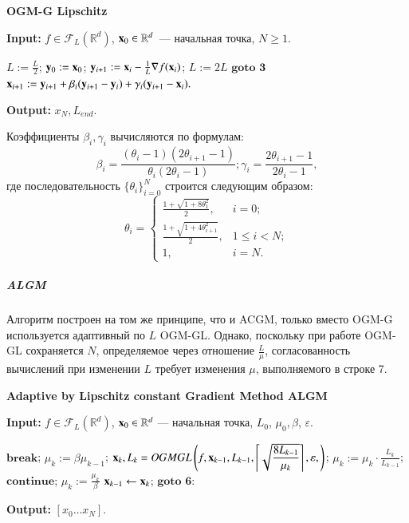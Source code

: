 \documentclass{crm-article}
\begin{document}
\begin{algorithm}
\caption{\bf{OGM-G Lipschitz}}
\label{OGM-GL}
\hspace*{\algorithmicindent} \textbf{Input: }$f\in \mathcal{F}_L(\mathbb{R}^d)$, ${\bf x}_0\in\mathbb{R}^d$~--- начальная точка, $N\geq 1$.
\begin{algorithmic}[1]
\STATE $L := \frac{L}{2}$;
\STATE ${\bf y}_0 := {\bf x}_0$;
\STATE ${\bf y}_{i+1} := {\bf x}_i - \frac{1}{L}\nabla f({\bf x}_i)$;
\STATE $L := 2L$
\STATE $\textbf{goto 3}$
\ENDIF
\STATE ${\bf x}_{i+1} := {\bf y}_{i+1} + \beta_i({\bf y}_{i+1} - {\bf y}_i) + \gamma_i({\bf y}_{i+1} - {\bf x}_i).$
\ENDFOR
\end{algorithmic}
\hspace*{\algorithmicindent} \textbf{Output: } $x_N, L_{end}$.
\end{algorithm}

Коэффициенты $\beta_i, \gamma_i$ вычисляются по формулам:
$$\beta_i = \dfrac{(\theta_i-1)(2\theta_{i+1}-1)}{\theta_i(2\theta_i-1)}; \gamma_i = \dfrac{2\theta_{i+1}-1}{2\theta_i-1},$$
где последовательность $\{\theta_i\}_{i=0}^N$ строится следующим образом:
\[ \theta_i = \begin{cases}
\frac{1+\sqrt{1+8\theta_1^2}}{2}, & i=0;\\
\frac{1+\sqrt{1+4\theta_{i+1}^2}}{2}, & 1\leq i<N;\\
1, & i=N.
\end{cases} \]

\subparagraph{ALGM}

Алгоритм построен на том же принципе, что и ACGM, только вместо OGM-G используется адаптивный по $L$ OGM-GL. Однако, поскольку при работе OGM-GL сохраняется $N$, определяемое через отношение $\frac{L}{\mu}$, согласованность вычислений при изменении $L$ требует изменения $\mu$, выполняемого в строке 7.

\begin{algorithm}
\caption{\bf{Adaptive by Lipschitz constant Gradient Method ALGM}}
\label{ALGM}
\hspace*{\algorithmicindent} \textbf{Input: } $f\in \mathcal{F}_L(\mathbb{R}^d)$, ${\bf x}_0\in\mathbb{R}^d$ --- начальная точка, $L_0$, $\mu_0, \beta$, $\varepsilon$.
\begin{algorithmic}[1]
\STATE $\textbf{break}$;
\ENDIF
\STATE $\mu_k:=\beta\mu_{k-1}$;
\STATE ${\bf x}_k, L_k = OGMGL\left(f, {\bf x}_{k-1}, L_{k-1}, \left\lceil \sqrt{\dfrac{8L_{k-1}}{\mu_k}}\right\rceil, \varepsilon, \right)$;
\STATE $\mu_k := \mu_k\cdot\frac{L_{k_{}}}{L_{k-1}}$;
\STATE $\textbf{continue}$;
\ENDIF
\STATE $\mu_k:=\frac{\mu_k}{\beta}$
\STATE ${\bf x}_{k-1}\leftarrow{\bf x}_k$;
\ENDIF
\STATE $\textbf{goto 6}$:
\ENDFOR
\end{algorithmic}
\hspace*{\algorithmicindent} \textbf{Output: } $[x_0\ldots x_N]$.
\end{algorithm}
\end{document}
